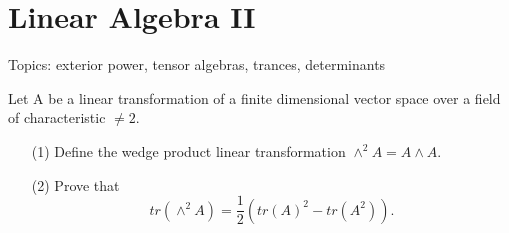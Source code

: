 \chapter{Linear Algebra II}
Topics: exterior power, tensor algebras, trances, determinants


\begin{prob}[F2016-Q5]
    Let A be a linear transformation of a finite dimensional vector space over a field of characteristic \(\neq 2\).
    \begin{itemize}
        \item[(1)] Define the wedge product linear transformation \(\wedge^{2}A=A\wedge A\).
        \item[(2)] Prove that
        \[tr(\wedge^{2}A)=\frac{1}{2}(tr(A)^{2}-tr(A^{2})).\]
    \end{itemize}
\end{prob}
